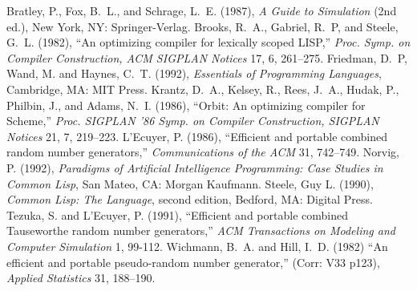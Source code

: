 \documentclass{article}
\begin{document}
\begin{thebibliography}{99}
  {\sc Bratley, P., Fox, B.~L., and Schrage, L.~E.} (1987), {\em A
    Guide to Simulation\/} (2nd ed.), New York, NY: Springer-Verlag.
  {\sc Brooks, R.~A., Gabriel, R.~P, and Steele, G.~L.} (1982), ``An
    optimizing compiler for lexically scoped LISP,'' {\em Proc. Symp.
      on Compiler Construction, ACM SIGPLAN Notices} 17, 6, 261--275.
  {\sc Friedman, D.~P, Wand, M. and Haynes, C.~T.} (1992), {\em
  Essentials of Programming Languages}, Cambridge, MA: MIT Press.
  {\sc Krantz, D.~A., Kelsey, R., Rees, J.~A., Hudak, P., Philbin, J.,
    and Adams, N.~I.} (1986), ``Orbit: An optimizing compiler for
    Scheme,'' {\em Proc. SIGPLAN '86 Symp. on Compiler Construction,
      SIGPLAN Notices} 21, 7, 219--223.
  {\sc L'Ecuyer, P.} (1986), ``Efficient and portable combined random
  number generators,'' {\em Communications of the ACM}\/ 31, 742--749.
  {\sc Norvig, P.} (1992), {\em Paradigms of Artificial Intelligence
  Programming: Case Studies in Common Lisp}, San Mateo, CA: Morgan
  Kaufmann.
  {\sc Steele, Guy L.} (1990), {\em Common Lisp: The Language}, 
  second edition, Bedford, MA: Digital Press.
  {\sc Tezuka, S. and L'Ecuyer, P.} (1991), ``Efficient and port\-able
  combined Tauseworthe random number generators,'' {\em ACM
    Transactions on Modeling and Computer Simulation}\/ 1, 99-112.
  {\sc Wichmann, B.~A. and Hill, I.~D.} (1982) ``An efficient and
  portable pseudo-random number generator,'' (Corr: V33 p123), {\em
    Applied Statistics}\/ 31, 188--190.
\end{thebibliography}


\end{document}
